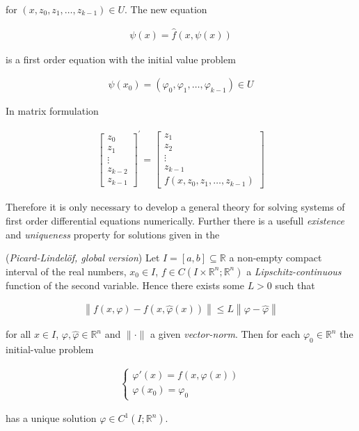 for $(x,z_0,z_1,\hdots, z_{k-1}) \in U$. The new equation

\begin{gather}
	\boxed{\psi(x) = \hat{f}(x,\psi(x))}
\end{gather}

is a first order equation with the initial value problem 

	\begin{gather*}
		\psi(x_0) = \left( \varphi_0,\varphi_1,\hdots,\varphi_{k-1} \right) \in U
	\end{gather*}

In matrix formulation

\begin{gather}
	\begin{bmatrix}
		z_0\\
		z_1\\
		\vdots\\
		z_{k-2}\\
		z_{k-1}
	\end{bmatrix}^{'}
	=
	\begin{bmatrix}
		z_1\\
		z_2\\
		\vdots\\
		z_{k-1}\\
		f(x,z_0,z_1,\hdots,z_{k-1})
	\end{bmatrix}
\end{gather}

Therefore it is only necessary to develop a general theory for solving systems of first order differential equations numerically. Further there is a usefull \emph{existence} and \emph{uniqueness} property for solutions given in the

\begin{mdframed}
	\begin{theorem}(\emph{Picard-Lindelöf, global version})
		Let $I = [a,b] \subseteq \mathbb{R}$ a non-empty compact interval of the real numbers, $x_0 \in I$, $f \in C(I \times \mathbb{R}^n;\mathbb{R}^n)$ a \emph{Lipschitz-continuous} function of the second variable. Hence there exists some $L > 0$ such that

		\begin{gather*}
			\left\| f(x, \varphi) - f(x,\hat{\varphi}(x))\right\| \leqslant L \left\| \varphi - \hat{\varphi} \right\|
		\end{gather*}

		for all $x \in I$, $\varphi, \hat{\varphi} \in \mathbb{R}^n$ and $\|\cdot\|$ a given \emph{vector-norm}. Then for each $\varphi_0 \in \mathbb{R}^n$ the initial-value problem

		\begin{gather}
			\begin{cases}
				\varphi'(x) = f(x,\varphi(x))\\
				\varphi(x_0) = \varphi_0
			\end{cases}
		\end{gather}

		has a unique solution $\varphi \in C^1(I;\mathbb{R}^n)$.
	\end{theorem}
\end{mdframed}

